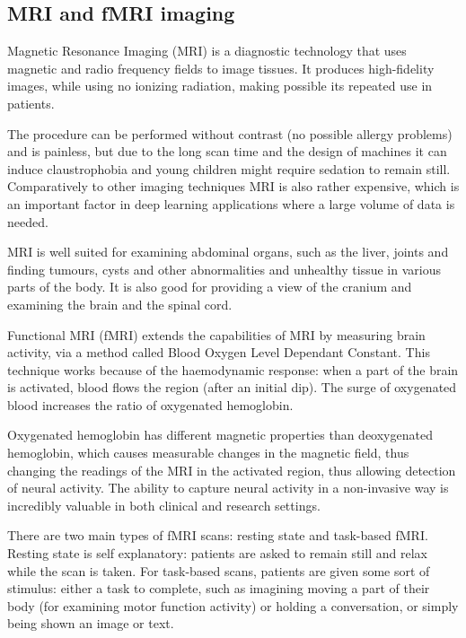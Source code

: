 	
	
	
	\subsection{MRI and fMRI imaging}
	
	Magnetic Resonance Imaging (MRI) is a diagnostic technology that uses magnetic and radio frequency fields to image tissues\cite{atkins2002fully}. It produces high-fidelity images, while using no ionizing radiation, making possible its repeated use in patients. 
	
	The procedure can be performed without contrast (no possible allergy problems) and is painless, but due to the long scan time and the design of machines it can induce claustrophobia and young children might require sedation to remain still. Comparatively to other imaging techniques MRI is also rather expensive, which is an important factor in deep learning applications where a large volume of data is needed.
	
	MRI is well suited for examining abdominal organs, such as the liver, joints and finding tumours, cysts and other abnormalities and unhealthy tissue in various parts of the body. It is also good for providing a view of the cranium and examining the brain and the spinal cord.
	
	Functional MRI (fMRI) extends the capabilities of MRI by measuring brain activity, via a method called Blood Oxygen Level Dependant Constant\cite{glover2011overview}. This technique works because of the haemodynamic response: when a part of the brain is activated, blood flows the region (after an initial dip). The surge of oxygenated blood increases the ratio of oxygenated hemoglobin.
	
	Oxygenated hemoglobin has different magnetic properties than deoxygenated hemoglobin, which causes measurable changes in the magnetic field, thus changing the readings of the MRI in the activated region, thus allowing detection of neural activity. The ability to capture neural activity in a non-invasive way is incredibly valuable in both clinical and research settings.
	
	There are two main types of fMRI scans: resting state and task-based fMRI. Resting state is self explanatory: patients are asked to remain still and relax while the scan is taken. For task-based scans, patients are given some sort of stimulus: either a task to complete, such as imagining moving a part of their body (for examining motor function activity) or holding a conversation, or simply being shown an image or text. 
	
